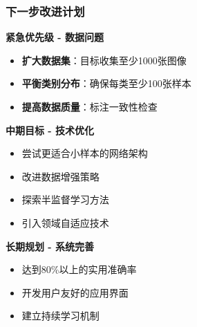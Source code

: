 \documentclass[12pt]{beamer}
\begin{document}
\begin{frame}
\frametitle{下一步改进计划}
\begin{block}{\textbf{紧急优先级 - 数据问题}}
\begin{itemize}
    \item \textbf{扩大数据集}：目标收集至少1000张图像
    \item \textbf{平衡类别分布}：确保每类至少100张样本
    \item \textbf{提高数据质量}：标注一致性检查
\end{itemize}
\end{block}

\begin{block}{\textbf{中期目标 - 技术优化}}
\begin{itemize}
    \item 尝试更适合小样本的网络架构
    \item 改进数据增强策略
    \item 探索半监督学习方法
    \item 引入领域自适应技术
\end{itemize}
\end{block}

\begin{block}{\textbf{长期规划 - 系统完善}}
\begin{itemize}
    \item 达到80\%以上的实用准确率
    \item 开发用户友好的应用界面
    \item 建立持续学习机制
\end{itemize}
\end{block}
\end{frame}
\end{document}
